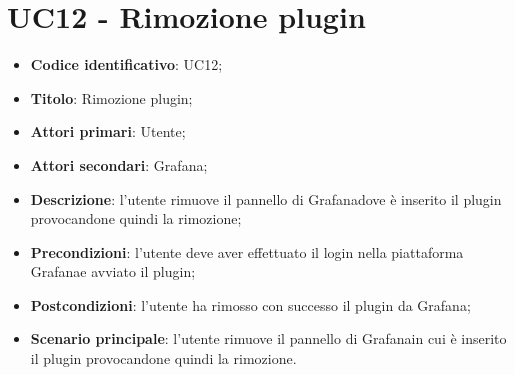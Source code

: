 \section{UC12 - Rimozione plugin}
\begin{itemize}
    \item \textbf{Codice identificativo}: UC12;
    \item \textbf{Titolo}: Rimozione plugin;
    \item \textbf{Attori primari}: Utente;
    \item \textbf{Attori secondari}: Grafana\glo;
    \item \textbf{Descrizione}: l'utente rimuove il pannello di Grafana\glosp dove è inserito il plugin provocandone quindi la rimozione;
    \item \textbf{Precondizioni}: l'utente deve aver effettuato il login nella piattaforma Grafana\glo e avviato il plugin;
    \item \textbf{Postcondizioni}: l'utente ha rimosso con successo il plugin da Grafana\glo;
    \item \textbf{Scenario principale}: l'utente rimuove il pannello di Grafana\glosp in cui è inserito il plugin provocandone quindi la rimozione.
\end{itemize}